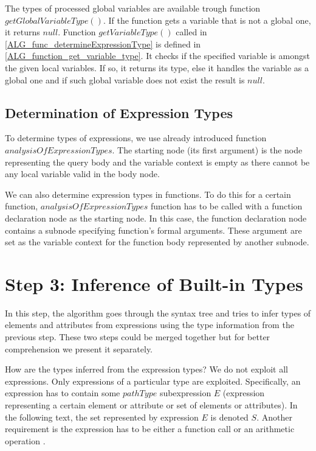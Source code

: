 The types of processed global variables are available trough function $getGlobalVariableType()$. If the function gets a variable that is not a global one, it returns $null$. Function $getVariableType()$ called in \ref{ALG_func_determineExpressionType} is defined in \ref{ALG_function_get_variable_type}. It checks if the specified variable is amongst the given local variables. If so, it returns its type, else it handles the variable as a global one and if such global variable does not exist the result is $null$.

\subsection{Determination of Expression Types}
To determine types of expressions, we use already introduced function $analysisOfExpressionTypes$. The starting node (its first argument) is the node representing the query body and the variable context is empty as there cannot be any local variable valid in the body node.

We can also determine expression types in functions. To do this for a certain function, $analysisOfExpressionTypes$ function has to be called with a function declaration node as the starting node. In this case, the function declaration node contains a subnode specifying function's formal arguments. These argument are set as the variable context for the function body represented by another subnode.

\section{Step 3: Inference of Built-in Types}
In this step, the algorithm goes through the syntax tree and tries to infer types of elements and attributes from expressions using the type information from the previous step. These two steps could be merged together but for better comprehension we present it separately.

How are the types inferred from the expression types? We do not exploit all expressions. Only expressions of a particular type are exploited. Specifically, an expression has to contain some $pathType$ subexpression $E$ (expression representing a certain element or attribute or set of elements or attributes). In the following text, the set represented by expression $E$ is denoted $S$. Another requirement is the expression has to be either a function call or an arithmetic operation .

